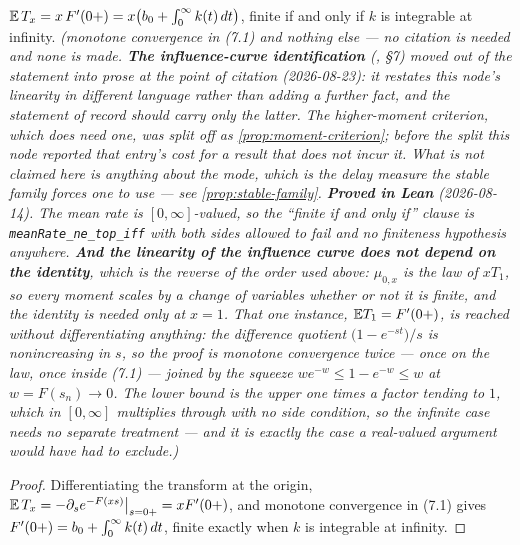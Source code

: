\begin{proposition}\label{prop:moments}
\leanok
$\mathbb{E}\,T_x = x\,F'(0{+}) = x\bigl(b_0 + \int_0^\infty k(t)\,dt\bigr)$, finite if and only if $k$
is integrable at infinity.
\statusT\quad\emph{(monotone convergence in (7.1) and nothing else --- no citation is needed and
none is made. \textbf{The influence-curve identification} (, \S7)
moved out of the statement into prose at the point of citation (2026-08-23): it restates this
node's linearity in different language rather than adding a further fact, and the statement of
record should carry only the latter. The higher-moment criterion, which \emph{does} need one, was
split off as
\ref{prop:moment-criterion}; before the split this node reported that entry's cost for a result
that does not incur it. What is \emph{not} claimed here is anything about the mode, which is the
delay measure the stable family forces one to use --- see \ref{prop:stable-family}.
\textbf{Proved in Lean} (2026-08-14). The mean rate is
$[0,\infty]$-valued, so the ``finite if and only if'' clause is
\texttt{meanRate\_ne\_top\_iff} with both sides allowed to fail and no finiteness hypothesis
anywhere. \textbf{And the linearity of the influence curve does not depend on the identity}, which
is the reverse of the order used above: $\mu_{0,x}$ is the law of $x T_1$, so every moment scales
by a change of variables whether or not it is finite, and the identity is needed only at $x = 1$.
That one instance, $\mathbb{E} T_1 = F'(0{+})$, is reached without differentiating anything: the
difference quotient $\bigl(1 - e^{-st}\bigr)/s$ is \emph{nonincreasing} in $s$, so the proof is
monotone convergence twice --- once on the law, once inside (7.1) --- joined by the squeeze
$we^{-w} \le 1 - e^{-w} \le w$ at $w = F(s_n) \to 0$. The lower bound is the upper one times a
factor tending to $1$, which in $[0,\infty]$ multiplies through with no side condition, so the
infinite case needs no separate treatment --- and it is exactly the case a real-valued argument
would have had to exclude.)}
\end{proposition}

\begin{proof}
\leanok
Differentiating the transform at the origin,
$\mathbb{E}\,T_x = -\partial_s e^{-F(xs)}\big|_{s=0{+}} = x F'(0{+})$, and monotone convergence in
(7.1) gives $F'(0{+}) = b_0 + \int_0^\infty k(t)\,dt$, finite exactly when $k$ is integrable at
infinity.
\end{proof}

